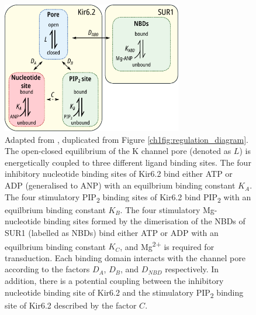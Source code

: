 \begin{figure}[h]
	\centering
	\includegraphics[width=0.7\textwidth]{regulation_diagram.pdf}
	\caption[Modes of regulation of K\ATP{} - reprinted]{
	Adapted from \cite{puljung_cryo-electron_2018}, duplicated from Figure \ref{ch1fig:regulation_diagram}.
	The open-closed equilibrium of the K\ATP{} channel pore (denoted as $L$) is energetically coupled to three different ligand binding sites.
	The four inhibitory nucleotide binding sites of Kir6.2 bind either ATP or ADP (generalised to ANP) with an equilbrium binding constant $K_A$.
	The four stimulatory PIP\textsubscript{2} binding sites of Kir6.2 bind PIP\textsubscript{2} with an equilbrium binding constant $K_B$.
	The four stimulatory Mg-nucleotide binding sites formed by the dimerisation of the NBDs of SUR1 (labelled as NBDs) bind either ATP or ADP with an equilbrium binding constant $K_C$, and Mg\textsuperscript{2+} is required for transduction.
	Each binding domain interacts with the channel pore according to the factors $D_A$, $D_B$, and $D_{NBD}$ respectively.
	In addition, there is a potential coupling between the inhibitory nucleotide binding site of Kir6.2 and the stimulatory PIP\textsubscript{2} binding site of Kir6.2 described by the factor $C$.
	}\label{ch7fig:regulation_diagram}
\end{figure}

